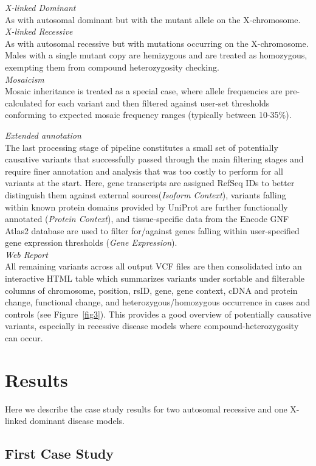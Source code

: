 \documentclass[twocolumn]{bmcart}%
\newcommand{\triplesub}[2]{\noindent\textsl{#1}\\#2\\}  %
\newcommand{\changes}[1]{{\color{red} #1}}
\begin{document}
{{	\triplesub{X-linked Dominant}{As with autosomal dominant but with the mutant allele on the X-chromosome.}
	
	\triplesub{X-linked Recessive}{As with autosomal recessive but with mutations occurring on the X-chromosome. Males with a single mutant copy are hemizygous and are treated as homozygous, exempting them from compound heterozygosity checking.}
	
	\triplesub{Mosaicism}{Mosaic inheritance is treated as a special case, where allele frequencies are pre-calculated for each variant and then filtered against user-set thresholds conforming to expected mosaic frequency ranges (typically between 10-35\%).}
}

\changes{\triplesub{Extended annotation}{The last processing stage of pipeline constitutes a small set of potentially causative variants that successfully passed through the main filtering stages and require finer annotation and analysis that was too costly to perform for all variants at the start. Here, gene transcripts are assigned RefSeq IDs to better distinguish them against external sources(\textit{Isoform Context}), variants falling within known protein domains provided by UniProt are further functionally annotated (\textit{Protein Context}), and tissue-specific data from the Encode GNF Atlas2 database are used to filter for/against genes falling within user-specified gene expression thresholds (\textit{Gene Expression}).}

\triplesub{Web Report}{All remaining variants across all output VCF files are then consolidated into an interactive HTML table which summarizes variants under sortable and filterable columns of chromosome, position, rsID, gene, gene context, cDNA and protein change, functional change, and heterozygous/homozygous occurrence in cases and controls (see Figure~\ref{fig3}). This provides a good overview of potentially causative variants, especially in recessive disease models where compound-heterozygosity can occur.
}}
}

\section*{Results}

Here we describe the case study results for two autosomal recessive and one X-linked dominant disease models.

\subsection*{First Case Study}
\end{document}

